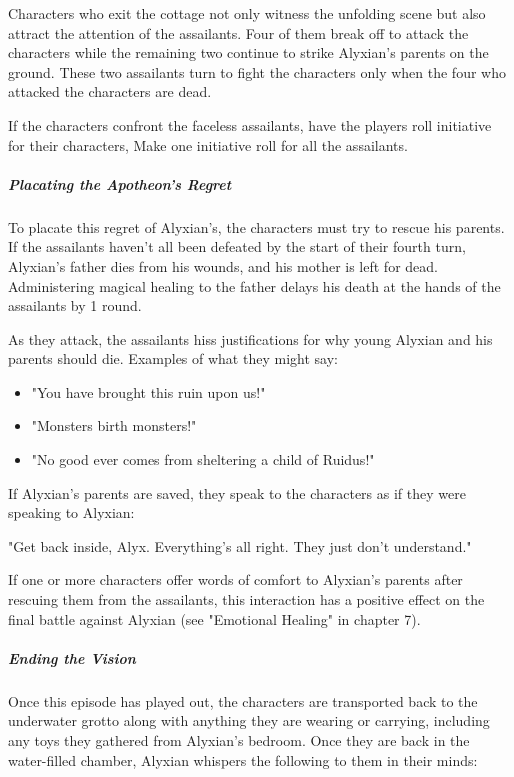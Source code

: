 \documentclass[10pt,a4paper,twoside,bg=print,twocolumn,openany,nodeprecatedcode]{dndbook}
\begin{document}
Characters who exit the cottage not only witness the unfolding scene but also attract the attention of the assailants. Four of them break off to attack the characters while the remaining two continue to strike Alyxian's parents on the ground. These two assailants turn to fight the characters only when the four who attacked the characters are dead.

If the characters confront the faceless assailants, have the players roll initiative for their characters, Make one initiative roll for all the assailants.

\subparagraph{Placating the Apotheon's Regret}
To placate this regret of Alyxian's, the characters must try to rescue his parents. If the assailants haven't all been defeated by the start of their fourth turn, Alyxian's father dies from his wounds, and his mother is left for dead. Administering magical healing to the father delays his death at the hands of the assailants by 1 round.

As they attack, the assailants hiss justifications for why young Alyxian and his parents should die. Examples of what they might say:


\begin{itemize}
\item "You have brought this ruin upon us!"
\item "Monsters birth monsters!"
\item "No good ever comes from sheltering a child of Ruidus!"
\end{itemize}

If Alyxian's parents are saved, they speak to the characters as if they were speaking to Alyxian:

\begin{DndReadAloud}{}
"Get back inside, Alyx. Everything's all right. They just don't understand."

\end{DndReadAloud}

If one or more characters offer words of comfort to Alyxian's parents after rescuing them from the assailants, this interaction has a positive effect on the final battle against Alyxian (see "Emotional Healing" in chapter 7).

\subparagraph{Ending the Vision}
Once this episode has played out, the characters are transported back to the underwater grotto along with anything they are wearing or carrying, including any toys they gathered from Alyxian's bedroom. Once they are back in the water-filled chamber, Alyxian whispers the following to them in their minds:
\end{document}
